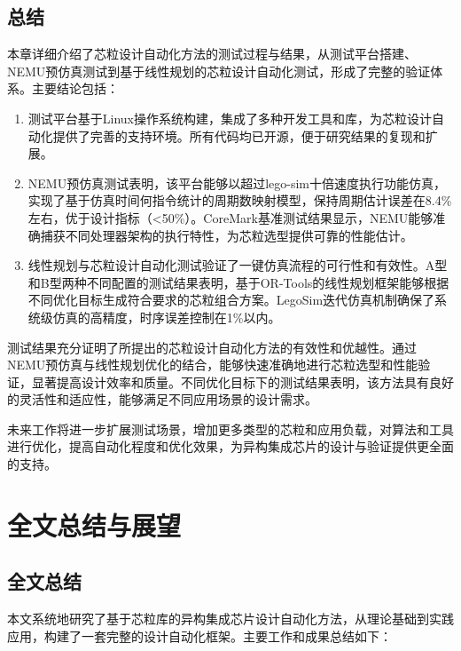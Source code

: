 \documentclass[bachelor]{thesis-uestc}
\begin{document}
\section{总结}

本章详细介绍了芯粒设计自动化方法的测试过程与结果，从测试平台搭建、NEMU预仿真测试到基于线性规划的芯粒设计自动化测试，形成了完整的验证体系。主要结论包括：

\begin{enumerate}
    \item 测试平台基于Linux操作系统构建，集成了多种开发工具和库，为芯粒设计自动化提供了完善的支持环境。所有代码均已开源，便于研究结果的复现和扩展。
    
    \item NEMU预仿真测试表明，该平台能够以超过lego-sim十倍速度执行功能仿真，实现了基于仿真时间何指令统计的周期数映射模型，保持周期估计误差在8.4\%左右，优于设计指标（<50\%）。CoreMark基准测试结果显示，NEMU能够准确捕获不同处理器架构的执行特性，为芯粒选型提供可靠的性能估计。
    
    \item 线性规划与芯粒设计自动化测试验证了一键仿真流程的可行性和有效性。A型和B型两种不同配置的测试结果表明，基于OR-Tools的线性规划框架能够根据不同优化目标生成符合要求的芯粒组合方案。LegoSim迭代仿真机制确保了系统级仿真的高精度，时序误差控制在1\%以内。
\end{enumerate}

测试结果充分证明了所提出的芯粒设计自动化方法的有效性和优越性。通过NEMU预仿真与线性规划优化的结合，能够快速准确地进行芯粒选型和性能验证，显著提高设计效率和质量。不同优化目标下的测试结果表明，该方法具有良好的灵活性和适应性，能够满足不同应用场景的设计需求。

未来工作将进一步扩展测试场景，增加更多类型的芯粒和应用负载，对算法和工具进行优化，提高自动化程度和优化效果，为异构集成芯片的设计与验证提供更全面的支持。





\chapter{全文总结与展望}

\section{全文总结}

本文系统地研究了基于芯粒库的异构集成芯片设计自动化方法，从理论基础到实践应用，构建了一套完整的设计自动化框架。主要工作和成果总结如下：
\end{document}
